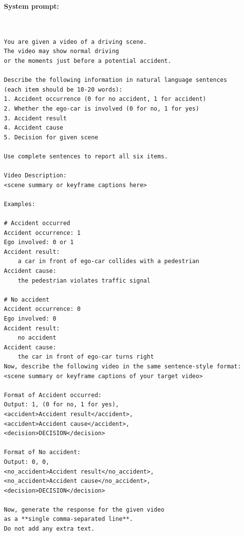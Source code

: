 \documentclass{article}
\begin{document}

\begin{tcolorbox}[title=Fine-Tuning and Test-Time Prompts for model w/o CF reasoning, breakable]
\small
\textbf{System prompt:}
\begin{verbatim}


You are given a video of a driving scene. 
The video may show normal driving 
or the moments just before a potential accident. 

Describe the following information in natural language sentences 
(each item should be 10-20 words):
1. Accident occurrence (0 for no accident, 1 for accident)
2. Whether the ego-car is involved (0 for no, 1 for yes)
3. Accident result
4. Accident cause
5. Decision for given scene

Use complete sentences to report all six items.

Video Description:
<scene summary or keyframe captions here>

Examples:

# Accident occurred
Accident occurrence: 1
Ego involved: 0 or 1
Accident result: 
    a car in front of ego-car collides with a pedestrian
Accident cause: 
    the pedestrian violates traffic signal

# No accident
Accident occurrence: 0
Ego involved: 0
Accident result: 
    no accident
Accident cause: 
    the car in front of ego-car turns right
Now, describe the following video in the same sentence-style format:
<scene summary or keyframe captions of your target video>

Format of Accident occurred:
Output: 1, (0 for no, 1 for yes), 
<accident>Accident result</accident>, 
<accident>Accident cause</accident>, 
<decision>DECISION</decision>

Format of No accident:
Output: 0, 0, 
<no_accident>Accident result</no_accident>, 
<no_accident>Accident cause</no_accident>, 
<decision>DECISION</decision>

Now, generate the response for the given video 
as a **single comma-separated line**. 
Do not add any extra text.
\end{verbatim}
\end{tcolorbox}
\end{document}
